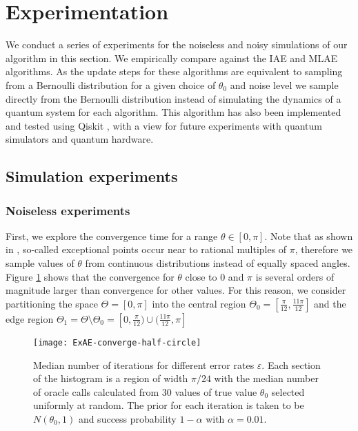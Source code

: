 \section{Experimentation}

We conduct a series of experiments for the noiseless and noisy simulations of our algorithm in this section. We empirically compare against the IAE and MLAE algorithms. As the update steps for these algorithms are equivalent to sampling from a Bernoulli distribution for a given choice of $\theta_0$ and noise level we sample directly from the Bernoulli distribution instead of simulating the dynamics of a quantum system for each algorithm. This algorithm has also been implemented and tested using Qiskit \cite{Qiskit}, with a view for future experiments with quantum simulators and quantum hardware.


\subsection{Simulation experiments}
\subsubsection{Noiseless experiments}
First, we explore the convergence time for a range $\theta \in [0, \pi]$. Note that as shown in \cite{callison_2022_amp_with_jitter}, so-called exceptional points occur near to rational multiples of $\pi$, therefore we sample values of $\theta$ from continuous distributions instead of equally spaced angles. Figure \ref{fig::ExAE-converge-half-circle} shows that the convergence for $\theta$ close to $0$ and $\pi$ is several orders of magnitude larger than convergence for other values. For this reason, we consider partitioning the space $\Theta = [0, \pi]$ into the central region $\Theta_0 = [\frac{\pi}{12}, \frac{11 \pi}{12}]$ and the edge region $\Theta_1 = \Theta \setminus \Theta_0 = [0, \frac{\pi}{12}) \cup (\frac{11 \pi}{12}, \pi]$

\begin{figure}[htb]
	\centering
	\texttt{[image: ExAE-converge-half-circle]}
	\caption{Median number of iterations for different error rates $\varepsilon$. Each section of the histogram is a region of width $\pi / 24$ with the median number of oracle calls calculated from 30 values of true value $\theta_0$ selected uniformly at random. The prior for each iteration is taken to be $N(\theta_0, 1)$ and success probability $1 - \alpha$ with $\alpha = 0.01$.}
	\label{fig::ExAE-converge-half-circle}
\end{figure}

